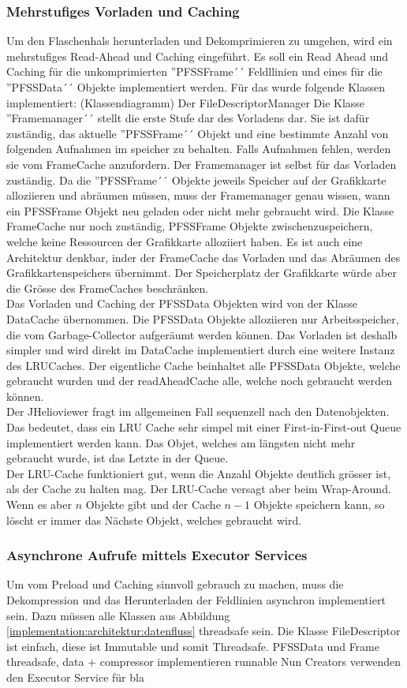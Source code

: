 \subsubsection{Mehrstufiges Vorladen und Caching}
Um den Flaschenhals herunterladen und Dekomprimieren zu umgehen, wird ein mehrstufiges Read-Ahead und Caching eingeführt. Es soll ein Read Ahead und Caching für die unkomprimierten ''PFSSFrame´´ Feldllinien und eines für die ''PFSSData´´ Objekte implementiert werden. Für das wurde folgende Klassen implementiert:
(Klassendiagramm)
Der FileDescriptorManager
Die Klasse ''Framemanager´´ stellt die erste Stufe dar des Vorladens dar. Sie ist dafür zuständig, das aktuelle ''PFSSFrame´´ Objekt und eine bestimmte Anzahl von folgenden Aufnahmen im speicher zu behalten. Falls Aufnahmen fehlen, werden sie vom FrameCache anzufordern. Der Framemanager ist selbst für das Vorladen zuständig. Da die ''PFSSFrame´´ Objekte jeweils Speicher auf der Grafikkarte alloziieren und abräumen müssen, muss der Framemanager genau wissen, wann ein PFSSFrame Objekt neu geladen oder nicht mehr gebraucht wird. Die Klasse FrameCache nur noch zuständig, PFSSFrame Objekte zwischenzuspeichern, welche keine Ressourcen der Grafikkarte alloziiert haben. Es ist auch eine Architektur denkbar, inder der FrameCache das Vorladen und das Abräumen des Grafikkartenspeichers übernimmt. Der Speicherplatz der Grafikkarte würde aber die Grösse des FrameCaches beschränken.\\
Das Vorladen und Caching der PFSSData Objekten wird von der Klasse DataCache übernommen. Die PFSSData Objekte alloziieren nur Arbeitsspeicher, die vom Garbage-Collector aufgeräumt werden können. Das Vorladen ist deshalb simpler und wird direkt im DataCache implementiert durch eine weitere Instanz des LRUCaches. Der eigentliche Cache beinhaltet alle PFSSData Objekte, welche gebraucht wurden und der readAheadCache alle, welche noch gebraucht werden können.\\
[\baselineskip] 
Der JHelioviewer fragt im allgemeinen Fall sequenzell nach den Datenobjekten. Das bedeutet, dass ein LRU Cache sehr simpel mit einer First-in-First-out Queue implementiert werden kann. Das Objet, welches am längsten nicht mehr gebraucht wurde, ist das Letzte in der Queue.\\
Der LRU-Cache funktioniert gut, wenn die Anzahl Objekte deutlich grösser ist, als der Cache zu halten mag. Der LRU-Cache versagt aber beim Wrap-Around. Wenn es aber $n$ Objekte gibt und der Cache $n-1$ Objekte speichern kann, so löscht er immer das Nächste Objekt, welches gebraucht wird. 

\subsubsection{Asynchrone Aufrufe mittels Executor Services}
Um vom Preload und Caching sinnvoll gebrauch zu machen, muss die Dekompression und das Herunterladen der Feldlinien asynchron implementiert sein. Dazu müssen alle Klassen aus Abbildung \ref{implementation:architektur:datenfluss} threadsafe sein.
Die Klasse FileDescriptor ist einfach, diese ist Immutable und somit Threadsafe.
PFSSData und Frame threadsafe, data + compressor implementieren runnable
Nun Creators verwenden den Executor Service für bla


